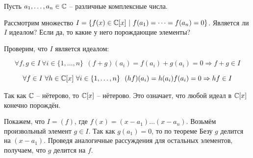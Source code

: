 Пусть $a_1, \dots, a_n \in \mathbb{C}$ -- различные комплексные числа. 

Рассмотрим множество
$I = \{ f(x) \in \mathbb{C}[x]\ |\ f(a_1) = \dots = f(a_n) = 0 \}$.
Является ли $I$ идеалом? Если да, то какие у него порождающие элементы?

Проверим, что $I$ является идеалом:

$$
\forall f, g \in I \ \forall i \in \{1, \dots, n \} \ \ 
(f + g)(a_i) = f(a_i) + g(a_i) = 0 \Rightarrow f + g \in I
$$

$$
\forall f \in I \ \forall h \in \Comp[x] \ 
\forall i \in \{1, \dots, n\} \ \ 
(h f)(a_i) = h(a_i) f(a_i) = 0 \Rightarrow hf \in I
$$

Так как $\mathbb{C}$ -- нётерово, то $\mathbb{C}[x]$ -- нётерово.
Это означает, что любой идеал в $\mathbb{C}[x]$ конечно порождён.

Покажем, что $I = (f)$, где $f(x) = (x - a_1) \dots (x - a_n)$.
Возьмём произвольный элемент $g \in I$. 
Так как $g(a_1) = 0$, то по теореме Безу $g$ делится на $(x - a_1)$.
Проведя аналогичные рассуждения для остальных элементов, получаем, что
$g$ делится на $f$.